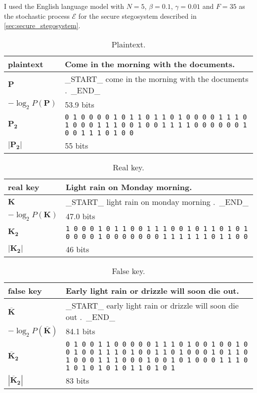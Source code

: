 \documentclass[draft]{IIBproject}
\begin{document}
I used the English language model with $N = 5$, $\beta = 0.1$, $\gamma = 0.01$ and $F = 35$ as the stochastic process $\mathcal E$ for the secure stegosystem described in \cref{sec:secure_stegosystem}.

\renewcommand{\arraystretch}{1.25}

\begin{table}[h]
	\centering
	\begin{tabular}{m{3cm} m{12cm}}
	\centering plaintext & Come in the morning with the documents. \\ \hline
	\centering $\mathbf P$ & \_START\_ come in the morning with the documents .\ \_END\_ \\ \hline
	\centering $-\log_2 P(\mathbf P)$ & 53.9 bits \\ \hline
	\centering $\mathbf{P_2}$ & \footnotesize \texttt{0 1 0 0 0 0 1 0 1 1 0 1 1 0 1 0 0 0 0 1 1 1 0 1 0 0 0 1 1 1 0 0 1 0 0 1 1 1 1 0 0 0 0 0 0 1 0 0 1 1 1 0 1 0 0} \\ \hline
	\centering $| \mathbf{P_2} |$ & 55 bits
	\end{tabular}
	\caption{\label{tab:results_plaintext}Plaintext.}
\end{table}

\begin{table}[h]
	\centering
	\begin{tabular}{m{3cm} m{12cm}}
	\centering real key & Light rain on Monday morning. \\ \hline
	\centering $\mathbf K$ & \_START\_ light rain on monday morning .\ \_END\_ \\ \hline
	\centering $-\log_2 P(\mathbf K)$ & 47.0 bits \\ \hline
	\centering $\mathbf{K_2}$ & \footnotesize \texttt{1 0 0 0 1 0 1 1 0 0 1 1 1 0 0 1 0 1 1 0 1 0 1 0 0 0 0 1 0 0 0 0 0 0 0 1 1 1 1 1 1 0 1 1 0 0} \\ \hline
	\centering $| \mathbf{K_2} |$ & 46 bits
	\end{tabular}
	\caption{\label{tab:results_real_key}Real key.}
\end{table}

\begin{table}[h]
	\centering
	\begin{tabular}{m{3cm} m{12cm}}
	\centering false key & Early light rain or drizzle will soon die out. \\ \hline
	\centering $\mathbf{\overline K}$ & \_START\_ early light rain or drizzle will soon die out .\ \_END\_ \\ \hline
	\centering $-\log_2 P(\mathbf{\overline K})$ & 84.1 bits \\ \hline
	\centering $\mathbf {\overline K_2}$ & \footnotesize \texttt{0 1 0 0 1 1 0 0 0 0 0 1 1 1 0 1 0 0 1 0 0 1 0 0 1 0 0 1 1 1 0 1 0 0 1 1 0 1 0 0 0 1 0 1 1 0 1 0 0 0 1 1 1 0 0 0 1 0 0 1 0 1 0 0 0 1 1 1 0 1 0 1 0 1 0 1 0 1 1 0 1 0 1} \\ \hline
	\centering $|\mathbf {\overline K_2}|$ & 83 bits
	\end{tabular}
	\caption{\label{tab:results_false_key}False key.}
\end{table}
\end{document}
